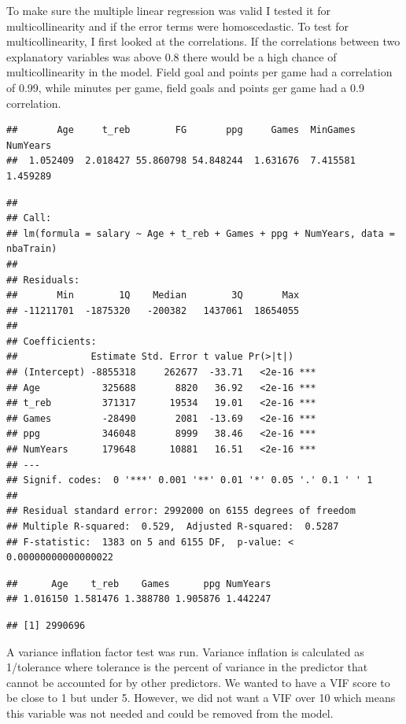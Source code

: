 \documentclass[]{article}
\begin{document}
To make sure the multiple linear regression was valid I tested it for
multicollinearity and if the error terms were homoscedastic. To test for
multicollinearity, I first looked at the correlations. If the
correlations between two explanatory variables was above 0.8 there would
be a high chance of multicollinearity in the model. Field goal and
points per game had a correlation of 0.99, while minutes per game, field
goals and points ger game had a 0.9 correlation.

\begin{verbatim}
##       Age     t_reb        FG       ppg     Games  MinGames  NumYears 
##  1.052409  2.018427 55.860798 54.848244  1.631676  7.415581  1.459289
\end{verbatim}

\begin{verbatim}
## 
## Call:
## lm(formula = salary ~ Age + t_reb + Games + ppg + NumYears, data = nbaTrain)
## 
## Residuals:
##       Min        1Q    Median        3Q       Max 
## -11211701  -1875320   -200382   1437061  18654055 
## 
## Coefficients:
##             Estimate Std. Error t value Pr(>|t|)    
## (Intercept) -8855318     262677  -33.71   <2e-16 ***
## Age           325688       8820   36.92   <2e-16 ***
## t_reb         371317      19534   19.01   <2e-16 ***
## Games         -28490       2081  -13.69   <2e-16 ***
## ppg           346048       8999   38.46   <2e-16 ***
## NumYears      179648      10881   16.51   <2e-16 ***
## ---
## Signif. codes:  0 '***' 0.001 '**' 0.01 '*' 0.05 '.' 0.1 ' ' 1
## 
## Residual standard error: 2992000 on 6155 degrees of freedom
## Multiple R-squared:  0.529,  Adjusted R-squared:  0.5287 
## F-statistic:  1383 on 5 and 6155 DF,  p-value: < 0.00000000000000022
\end{verbatim}

\begin{verbatim}
##      Age    t_reb    Games      ppg NumYears 
## 1.016150 1.581476 1.388780 1.905876 1.442247
\end{verbatim}

\begin{verbatim}
## [1] 2990696
\end{verbatim}

A variance inflation factor test was run. Variance inflation is
calculated as 1/tolerance where tolerance is the percent of variance in
the predictor that cannot be accounted for by other predictors. We
wanted to have a VIF score to be close to 1 but under 5. However, we did
not want a VIF over 10 which means this variable was not needed and
could be removed from the model.
\end{document}
